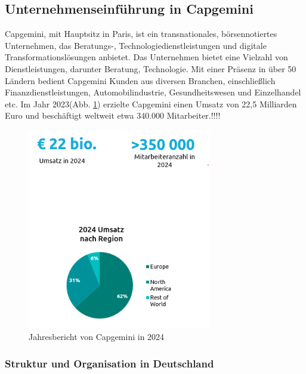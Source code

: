 \documentclass[a4paper, 12pt]{scrartcl}
\begin{document}
	\subsection{Unternehmenseinführung in Capgemini} %
	Capgemini, mit Hauptsitz in Paris, ist ein transnationales, börsennotiertes Unternehmen, das Beratungs-, Technologiedienstleistungen und digitale Transformationslösungen anbietet. Das Unternehmen bietet eine Vielzahl von Dienstleistungen, darunter Beratung, Technologie. Mit einer Präsenz in über 50 Ländern bedient Capgemini Kunden aus diversen Branchen, einschließlich Finanzdienstleistungen, Automobilindustrie, Gesundheitswesen und Einzelhandel etc. Im Jahr 2023(Abb. \ref{Stand von Capgemini}) erzielte Capgemini einen Umsatz von 22,5 Milliarden Euro und beschäftigt weltweit etwa 340.000 Mitarbeiter.!!!!
	\begin{figure}[h!]
		\begin{center}
			\includegraphics[width=8cm]{CApgemini zahlen.png}
			\caption{Jahresbericht von Capgemini in 2024\cite{Capgemini_allgemein}}
			\label{Stand von Capgemini}
		\end{center}
	\end{figure}
	\subsubsection{Struktur und Organisation in Deutschland}
	
\end{document}
